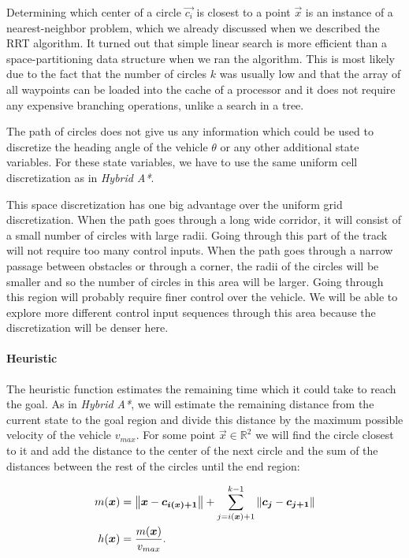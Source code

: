 Determining which center of a circle $\vec{c_i}$ is closest to a point $\vec{x}$ is an instance of a nearest-neighbor problem, which we already discussed when we described the RRT algorithm. It turned out that simple linear search is more efficient than a space-partitioning data structure when we ran the algorithm. This is most likely due to the fact that the number of circles $k$ was usually low and that the array of all waypoints can be loaded into the cache of a processor and it does not require any expensive branching operations, unlike a search in a tree.

The path of circles does not give us any information which could be used to discretize the heading angle of the vehicle $\theta$ or any other additional state variables. For these state variables, we have to use the same uniform cell discretization as in \textit{Hybrid A*}.

This space discretization has one big advantage over the uniform grid discretization. When the path goes through a long wide corridor, it will consist of a small number of circles with large radii. Going through this part of the track will not require too many control inputs. When the path goes through a narrow passage between obstacles or through a corner, the radii of the circles will be smaller and so the number of circles in this area will be larger. Going through this region will probably require finer control over the vehicle. We will be able to explore more different control input sequences through this area because the discretization will be denser here.

\paragraph{Heuristic}
The heuristic function estimates the remaining time which it could take to reach the goal. As in \textit{Hybrid A*}, we will estimate the remaining distance from the current state to the goal region and divide this distance by the maximum possible velocity of the vehicle $v_{max}$. For some point $\vec{x}\in \mathbb{R}^2$ we will find the circle closest to it and add the distance to the center of the next circle and the sum of the distances between the rest of the circles until the end region:

\begin{equation*}
\begin{aligned}
m(\bm{x})&=\left\lVert\bm{x}-\bm{c_{i(\bm{x})+1}}\right\rVert+\sum_{j=i(\bm{x})+1}^{k-1} \left\lVert\bm{c_j}-\bm{c_{j+1}}\right\rVert \\
h(\bm{x})&=\dfrac{m(\bm{x})}{v_{max}}.
\end{aligned}
\end{equation*}


